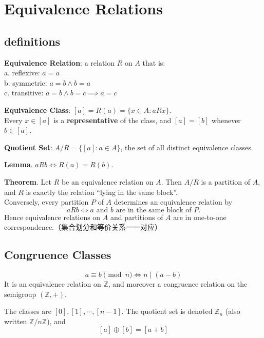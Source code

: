 \documentclass[12pt, a4paper, UTF8, openany]{ctexbook}
\newcommand{\field}[1]{\mathbb{#1}}%
\begin{document}
    \section{Equivalence Relations}
    \subsection{definitions}
        \textbf{Equivalence Relation}: a relation $R$ on $A$ that is:\\
        a. reflexive: $a = a$\\
        b. symmetric: $a = b \land b = a$\\
        c. transitive: $a = b \land b = c \implies a = c$


        \textbf{Equivalence Class}: $[a] = R(a) = \{x \in A : a R x\}$. \\
        Every $x \in [a]$ is a \textbf{representative} of the class, and $[a] = [b]$ whenever $b \in [a]$.

        \textbf{Quotient Set}: $A/R = \{[a] : a \in A\}$, the set of all distinct equivalence classes.

        \textbf{Lemma}. $a R b \iff R(a) = R(b)$.

        \textbf{Theorem}. Let $R$ be an equivalence relation on $A$. Then $A/R$ is a partition of $A$, and $R$ is exactly the relation ``lying in the same block''. \\
        Conversely, every partition $P$ of $A$ determines an equivalence relation by
        $$ a R b \iff a \text{ and } b \text{ are in the same block of } P. $$
        Hence equivalence relations on $A$ and partitions of $A$ are in one-to-one correspondence.（集合划分和等价关系一一对应）

        \subsection{Congruence Classes}
            $$ a \equiv b \pmod n \iff n \mid (a - b) $$
            It is an equivalence relation on $\field{Z}$, and moreover a congruence relation on the semigroup $(\field{Z}, +)$.

            The classes are $[0], [1], \cdots, [n-1]$. The quotient set is denoted $\field{Z}_n$ (also written $\field{Z}/n\field{Z}$), and
            $$ [a] \oplus [b] = [a + b] $$
\end{document}
